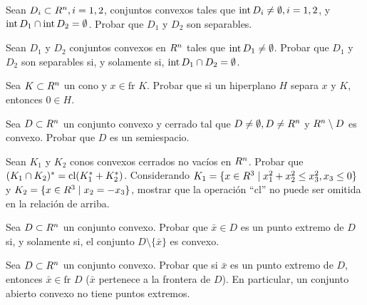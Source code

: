 \begin{exercise}\label{v1:ejer:3.2.17}
 Sean $D_i \subset R^n, i=1,2$, conjuntos convexos tales que $\operatorname{\operatorname{int}} D_i \neq \emptyset, i=1,2$, y $\operatorname{\operatorname{int}} D_1 \cap \operatorname{\operatorname{int}} D_2 = \emptyset$. Probar que $D_1$ y $D_2$ son separables.
\end{exercise}

\begin{exercise}\label{v1:ejer:3.2.18}
 Sean $D_1$ y $D_2$ conjuntos convexos en $R^n$ tales que $\operatorname{\operatorname{int}} D_1 \neq \emptyset$. Probar que $D_1$ y $D_2$ son separables si, y solamente si, $\operatorname{\operatorname{int}} D_1 \cap D_2 = \emptyset$.
\end{exercise}

\begin{exercise}\label{v1:ejer:3.2.19}
 Sea $K \subset R^n$ un cono y $x \in \text{fr } K$. Probar que si un hiperplano $H$ separa $x$ y $K$, entonces $0 \in H$.
\end{exercise}

\begin{exercise}\label{v1:ejer:3.2.20}
 Sea $D \subset R^n$ un conjunto convexo y cerrado tal que $D \neq \emptyset, D \neq R^n$ y $R^n \setminus D$ es convexo. Probar que $D$ es un semiespacio.
\end{exercise}

\begin{exercise}\label{v1:ejer:3.2.21}
 Sean $K_1$ y $K_2$ conos convexos cerrados no vacíos en $R^n$. Probar que $(K_1 \cap K_2)^* = \operatorname{cl}(K_1^* + K_2^*)$.
 Considerando $K_1 = \{ x \in R^3 \mid x_1^2 + x_2^2 \le x_3^2, x_3 \le 0 \}$ y $K_2 = \{ x \in R^3 \mid x_2 = -x_3 \}$, mostrar que la operación ``cl'' no puede ser omitida en la relación de arriba.
\end{exercise}

\begin{exercise}\label{v1:ejer:3.2.22}
 Sea $D \subset R^n$ un conjunto convexo. Probar que $\bar{x} \in D$ es un punto extremo de $D$ si, y solamente si, el conjunto $D \setminus \{\bar{x}\}$ es convexo.
\end{exercise}

\begin{exercise}\label{v1:ejer:3.2.23}
 Sea $D \subset R^n$ un conjunto convexo. Probar que si $\bar{x}$ es un punto extremo de $D$, entonces $\bar{x} \in \text{fr } D$ ($\bar{x}$ pertenece a la frontera de $D$). En particular, un conjunto abierto convexo no tiene puntos extremos.
\end{exercise}

